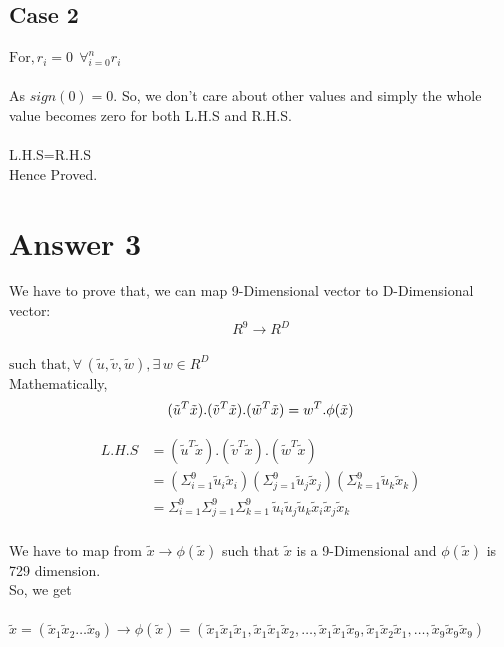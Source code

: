 \documentclass{article}
\begin{document}
\subsection{Case 2} 

$\text{For,} \,  r_i = 0  \;\, \forall_{i=0}^n r_i $ \\\\ As $sign(0)=0$. So, we don't care about other values and simply the whole value becomes zero for both L.H.S and R.H.S.\\\\
\hspace*{6cm}  L.H.S=R.H.S\\
\hspace*{6cm} Hence Proved.



\section{Answer 3}%
We have to prove that, we can map 9-Dimensional vector to D-Dimensional vector:\\
\[R^9 \to R^D\]
\\
$\text{such that,} \, \forall \, (\tilde{u},\tilde{v},\tilde{w}), \exists \, w \in R^D$\\ %
Mathematically,
\begin{equation}
(\tilde{u}^T\tilde{x}).(\tilde{v}^T\tilde{x}).(\tilde{w}^T\tilde{x}) = w^T.\phi(\tilde{x})\\
\end{equation}

\begin{align*} 
L.H.S & = (\tilde{u}^T\tilde{x}).(\tilde{v}^T\tilde{x}).(\tilde{w}^T\tilde{x})\\
& = (\Sigma_{i=1}^9 \tilde{u}_i\tilde{x}_i)(\Sigma_{j=1}^9 \tilde{u}_j\tilde{x}_j)(\Sigma_{k=1}^9 \tilde{u}_k\tilde{x}_k)\\
& = \Sigma_{i=1}^9\Sigma_{j=1}^9\Sigma_{k=1}^9 \, \tilde{u}_i\tilde{u}_j\tilde{u}_k\tilde{x}_i\tilde{x}_j\tilde{x}_k\\
\end{align*}

We have to map from $\tilde{x} \to \phi(\tilde{x})$ such that $\tilde{x}$ is a 9-Dimensional and $\phi(\tilde{x})$ is 729 dimension.\\
So, we get\\\\
$\tilde{x} = (\tilde{x}_1\tilde{x}_2 \dots \tilde{x}_9) \to\phi(\tilde{x}) = (\tilde{x}_1\tilde{x}_1\tilde{x}_1, \tilde{x}_1\tilde{x}_1\tilde{x}_2, \dots , \tilde{x}_1\tilde{x}_1\tilde{x}_9, \tilde{x}_1\tilde{x}_2\tilde{x}_1, \dots ,\tilde{x}_9\tilde{x}_9\tilde{x}_9) $\\
\end{document}

